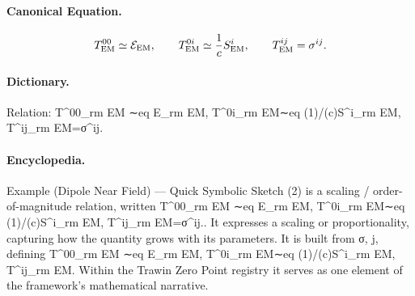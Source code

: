 \paragraph{Canonical Equation.}
\[
T^{00}_{\rm EM} \simeq \mathcal{E}_{\rm EM},\qquad T^{0i}_{\rm EM}\simeq \frac{1}{c}S^i_{\rm EM},\qquad T^{ij}_{\rm EM}=\sigma^{ij}.
\]

\paragraph{Dictionary.}
Relation: T\textasciicircum{}00\_rm EM ∼eq E\_rm EM, T\textasciicircum{}0i\_rm EM∼eq (1)/(c)S\textasciicircum{}i\_rm EM, T\textasciicircum{}ij\_rm EM=σ\textasciicircum{}ij.

\paragraph{Encyclopedia.}
Example (Dipole Near Field) — Quick Symbolic Sketch (2) is a scaling / order-of-magnitude relation, written T\textasciicircum{}00\_rm EM ∼eq E\_rm EM, T\textasciicircum{}0i\_rm EM∼eq (1)/(c)S\textasciicircum{}i\_rm EM, T\textasciicircum{}ij\_rm EM=σ\textasciicircum{}ij.. It expresses a scaling or proportionality, capturing how the quantity grows with its parameters. It is built from σ, j, defining T\textasciicircum{}00\_rm EM ∼eq E\_rm EM, T\textasciicircum{}0i\_rm EM∼eq (1)/(c)S\textasciicircum{}i\_rm EM, T\textasciicircum{}ij\_rm EM. Within the Trawin Zero Point registry it serves as one element of the framework's mathematical narrative.
